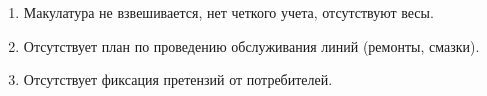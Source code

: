 \begin{enumerate}
\item 	Макулатура не взвешивается, нет четкого учета, отсутствуют весы. 


\item 	Отсутствует план по проведению обслуживания линий (ремонты, смазки).


\item 	Отсутствует фиксация претензий от потребителей.








  
\end{enumerate}

